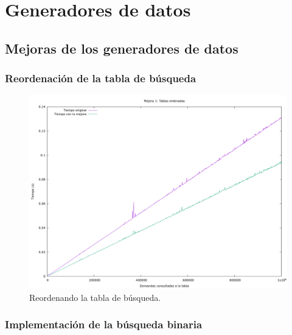 \documentclass[12pt, spanish]{article}
\begin{document}
\section{Generadores de datos}

\subsection{Mejoras de los generadores de datos}

\subsubsection{Reordenación de la tabla de búsqueda}

\begin{figure}[H]
	\centering
	\includegraphics[scale = 0.2]{t_mejora1.png}
	\caption{Reordenando la tabla de búsqueda.}
	\label{fig:ej1_a_150000}

\end{figure}


\subsubsection{Implementación de la búsqueda binaria}
\end{document}
